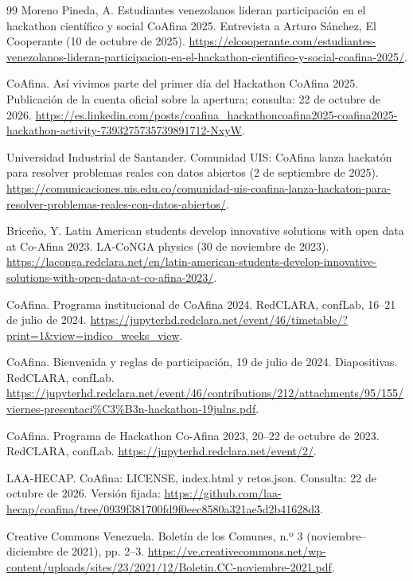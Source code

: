 \begin{thebibliography}{99}
 Moreno Pineda, A. Estudiantes venezolanos lideran participación en el hackathon científico y social CoAfina 2025. Entrevista a Arturo Sánchez, El Cooperante (10 de octubre de 2025). \url{https://elcooperante.com/estudiantes-venezolanos-lideran-participacion-en-el-hackathon-cientifico-y-social-coafina-2025/}.

 CoAfina. Así vivimos parte del primer día del Hackathon CoAfina 2025. Publicación de la cuenta oficial sobre la apertura; consulta: 22 de octubre de 2026. \url{https://es.linkedin.com/posts/coafina_hackathoncoafina2025-coafina2025-hackathon-activity-7393275735739891712-NxyW}.

 Universidad Industrial de Santander. Comunidad UIS: CoAfina lanza hackatón para resolver problemas reales con datos abiertos (2 de septiembre de 2025). \url{https://comunicaciones.uis.edu.co/comunidad-uis-coafina-lanza-hackaton-para-resolver-problemas-reales-con-datos-abiertos/}.

 Briceño, Y. Latin American students develop innovative solutions with open data at Co-Afina 2023. LA-CoNGA physics (30 de noviembre de 2023). \url{https://laconga.redclara.net/en/latin-american-students-develop-innovative-solutions-with-open-data-at-co-afina-2023/}.

 CoAfina. Programa institucional de CoAfina 2024. RedCLARA, confLab, 16--21 de julio de 2024. \url{https://jupyterhd.redclara.net/event/46/timetable/?print=1&view=indico_weeks_view}.

 CoAfina. Bienvenida y reglas de participación, 19 de julio de 2024. Diapositivas. RedCLARA, confLab. \url{https://jupyterhd.redclara.net/event/46/contributions/212/attachments/95/155/viernes-presentaci%C3%B3n-hackathon-19julns.pdf}.

 CoAfina. Programa de Hackathon Co-Afina 2023, 20--22 de octubre de 2023. RedCLARA, confLab. \url{https://jupyterhd.redclara.net/event/2/}.

 LAA-HECAP. CoAfina: LICENSE, index.html y retos.json. Consulta: 22 de octubre de 2026. Versión fijada: \url{https://github.com/laa-hecap/coafina/tree/0939f381700fd9f0eec8580a321ae5d2b41628d3}.

 Creative Commons Venezuela. Boletín de los Comunes, n.º 3 (noviembre--diciembre de 2021), pp. 2--3. \url{https://ve.creativecommons.net/wp-content/uploads/sites/23/2021/12/Boletin.CC-noviembre-2021.pdf}.


\end{thebibliography}
